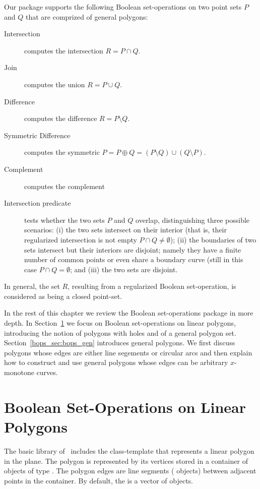 Our package supports the following Boolean set-operations on two point
sets $P$ and $Q$ that are comprized of general polygons:
\begin{description}
\item[Intersection] computes the intersection $R = P \cap Q$.
\item[Join] computes the union $R = P \cup Q$.
\item [Difference] computes the difference $R = P \setminus Q$.
\item [Symmetric Difference] computes the symmetric
   $P = P \oplus Q = (P \setminus Q) \cup (Q \setminus P)$.
\item[Complement] computes the complement
\item [Intersection predicate] tests whether the two sets $P$ and $Q$
  overlap, distinguishing three possible scenarios: (i) the two sets
  intersect on their interior (that is, their regularized intersection
  is not empty $P \cap Q \neq \emptyset$); (ii) the boundaries of two
  sets intersect but their interiors are disjoint; namely they have a
  finite number of common points or even share a boundary curve (still
  in this case $P \cap Q = \emptyset$; and (iii) the two sets are
  disjoint.
\end{description}
In general, the set $R$, resulting from a regularized Boolean
set-operation, is considered as being a closed point-set.

In the rest of this chapter we review the Boolean set-operations package
in more depth. In Section~\ref{bops_sec:bops_lin} we focus on Boolean 
set-operations on linear polygons, introducing the notion of polygons with 
holes and of a general polygon set. Section~\ref{bops_sec:bops_gen}
introduces general polygons.
We first discuss polygons whose edges are either line segements or circular
arcs and then explain how to construct and use general polygons whose edges
can be arbitrary $x$-monotone curves.

\section{Boolean Set-Operations on Linear Polygons}
\label{bops_sec:bops_lin}

The basic library of \cgal\ includes the 
class-template that represents a linear polygon in the plane. The
polygon is represented by its vertices stored in a container of
objects of type . The polygon edges are line
segments ( objects) between adjacent points in
the container. By default, the  is a vector of
 objects.

